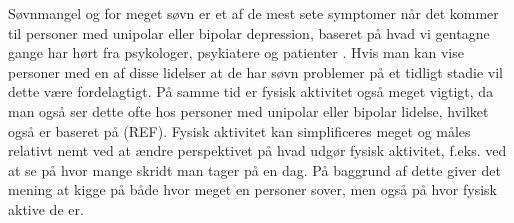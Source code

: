 Søvnmangel og for meget søvn er et af de mest sete symptomer når det kommer til personer med unipolar eller bipolar depression, baseret på hvad vi gentagne gange har hørt fra psykologer, psykiatere og patienter \citep{misc:jorgen-aagaard, misc:janne-rasmussen, misc:faellesrapp}.
Hvis man kan vise personer med en af disse lidelser at de har søvn problemer på et tidligt stadie vil dette være fordelagtigt.
På samme tid er fysisk aktivitet også meget vigtigt, da man også ser dette  ofte hos personer med unipolar eller bipolar lidelse, hvilket også er baseret på (REF).
Fysisk aktivitet kan simplificeres meget og måles relativt nemt ved at ændre perspektivet på hvad udgør fysisk aktivitet, f.eks. ved at se på hvor mange skridt man tager på en dag.
På baggrund af dette giver det mening at kigge på både hvor meget en personer sover, men også på hvor fysisk aktive de er.

